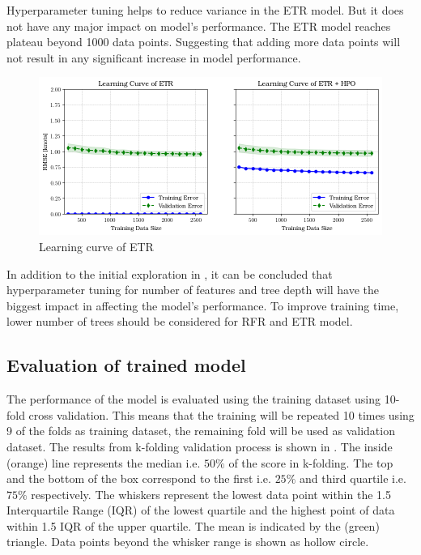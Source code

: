 Hyperparameter tuning helps to reduce variance in the ETR model. But it does not have any major impact on model's performance. The ETR model reaches plateau beyond 1000 data points. Suggesting that adding more data points will not result in any significant increase in model performance.

\begin{figure}[h]
    \centering
        \includegraphics[width=.95\textwidth]{02_figures/learning_curve_etr_rmse.png}
        \caption{Learning curve of ETR}
        \label{fig:learn_curve_ETR_RMSE}
\end{figure}

In addition to the initial exploration in , it can be concluded that hyperparameter tuning for number of features and tree depth will have the biggest impact in affecting the model's performance. To improve training time, lower number of trees should be considered for RFR and ETR model.


\subsection*{Evaluation of trained model}\label{sec:BBM_model_eval}

The performance of the model is evaluated using the training dataset using 10-fold cross validation. This means that the training will be repeated 10 times using 9 of the folds as training dataset, the remaining fold will be used as validation dataset. The results from k-folding validation process is shown in . The inside (orange) line represents the median i.e. $50\%$ of the score in k-folding. The top and the bottom of the box correspond to the first i.e. $25\%$ and third quartile i.e. $75\%$ respectively. The whiskers represent the lowest data point within the 1.5 Interquartile Range (IQR) of the lowest quartile and the highest point of data within 1.5 IQR of the upper quartile. The mean is indicated by the (green) triangle. Data points beyond the whisker range is shown as hollow circle.\\

